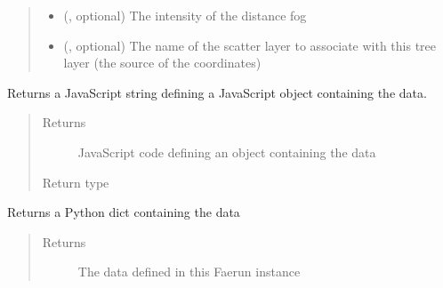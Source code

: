 \documentclass[letterpaper,10pt,english]{sphinxmanual}
\begin{document}
\begin{fulllineitems}
\begin{fulllineitems}
\begin{quote}
\begin{description}
\begin{itemize}
\item {} 
 (, optional) \textendash{} The intensity of the distance fog

\item {} 
 (, optional) \textendash{} The name of the scatter layer to associate with this tree layer (the source of the coordinates)

\end{itemize}

\end{description}\end{quote}

\end{fulllineitems}


\begin{fulllineitems}
\label{\detokenize{documentation:faerun.Faerun.create_data}}
Returns a JavaScript string defining a JavaScript object containing the data.
\begin{quote}\begin{description}
\item[{Returns}] \leavevmode
JavaScript code defining an object containing the data

\item[{Return type}] \leavevmode
{}

\end{description}\end{quote}

\end{fulllineitems}


\begin{fulllineitems}
\label{\detokenize{documentation:faerun.Faerun.create_python_data}}
Returns a Python dict containing the data
\begin{quote}\begin{description}
\item[{Returns}] \leavevmode
The data defined in this Faerun instance


\end{description}
\end{quote}
\end{fulllineitems}
\end{fulllineitems}
\end{document}
